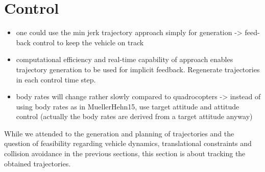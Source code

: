 \section{Control}
\label{sec:control}
\begin{itemize}
	\color{red}
	\item one could use the min jerk trajectory approach simply for generation -> feed-back control to keep the vehicle on track
	\item computational efficiency and real-time capability of approach enables trajectory generation to be used for implicit feedback. Regenerate trajectories in each control time step.
	\item body rates will change rather slowly compared to quadrocopters -> instead of using body rates as in MuellerHehn15, use target attitude and attitude control (actually the body rates are derived from a target attitude anyway)
\end{itemize}
While we attended to the generation and planning of trajectories and the question of feasibility regarding vehicle dynamics, translational constraints and collision avoidance in the previous sections, this section is about tracking the obtained trajectories.

